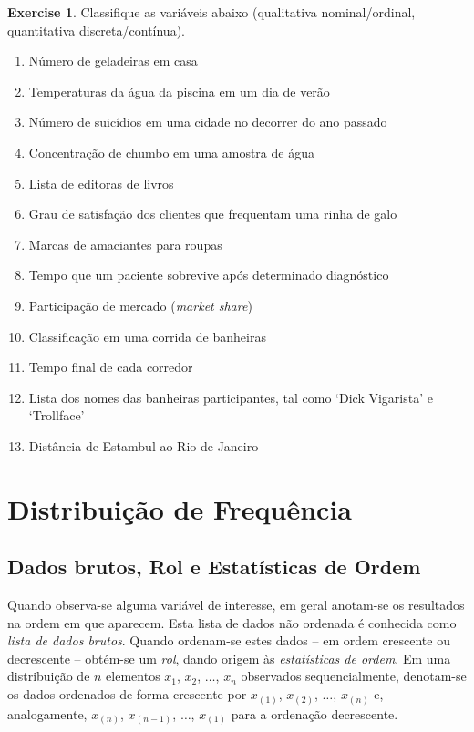 \documentclass[
]{book}
\providecommand{\tightlist}{%
  \setlength{\itemsep}{0pt}\setlength{\parskip}{0pt}}
\theoremstyle{definition}
\theoremstyle{definition}
\theoremstyle{definition}
\newtheorem{exercise}{Exercise}[chapter]
\theoremstyle{remark}
\begin{document}
\begin{exercise}
\protect\hypertarget{exr:class-var}{}{\label{exr:class-var} }Classifique as variáveis abaixo (qualitativa nominal/ordinal, quantitativa discreta/contínua).

\begin{enumerate}
\def\labelenumi{\alph{enumi}.}
\tightlist
\item
  Número de geladeiras em casa
\item
  Temperaturas da água da piscina em um dia de verão
\item
  Número de suicídios em uma cidade no decorrer do ano passado
\item
  Concentração de chumbo em uma amostra de água
\item
  Lista de editoras de livros
\item
  Grau de satisfação dos clientes que frequentam uma rinha de galo
\item
  Marcas de amaciantes para roupas
\item
  Tempo que um paciente sobrevive após determinado diagnóstico
\item
  Participação de mercado (\emph{market share})
\item
  Classificação em uma corrida de banheiras
\item
  Tempo final de cada corredor
\item
  Lista dos nomes das banheiras participantes, tal como `Dick Vigarista' e `Trollface'
\item
  Distância de Estambul ao Rio de Janeiro
\end{enumerate}
\end{exercise}

\hypertarget{distribuicao-de-frequencia}{%
\section{Distribuição de Frequência}\label{distribuicao-de-frequencia}}

\hypertarget{db-rol-eo}{%
\subsection{Dados brutos, Rol e Estatísticas de Ordem}\label{db-rol-eo}}

Quando observa-se alguma variável de interesse, em geral anotam-se os resultados na ordem em que aparecem. Esta lista de dados não ordenada é conhecida como \emph{lista de dados brutos}. Quando ordenam-se estes dados -- em ordem crescente ou decrescente -- obtém-se um \emph{rol}, dando origem às \emph{estatísticas de ordem}. Em uma distribuição de \(n\) elementos \(x_{1}\), \(x_{2}\), \(\ldots\), \(x_{n}\) observados sequencialmente, denotam-se os dados ordenados de forma crescente por \(x_{(1)}\), \(x_{(2)}\), \(\ldots\), \(x_{(n)}\) e, analogamente, \(x_{(n)}\), \(x_{(n-1)}\), \(\ldots\), \(x_{(1)}\) para a ordenação decrescente.
\end{document}
